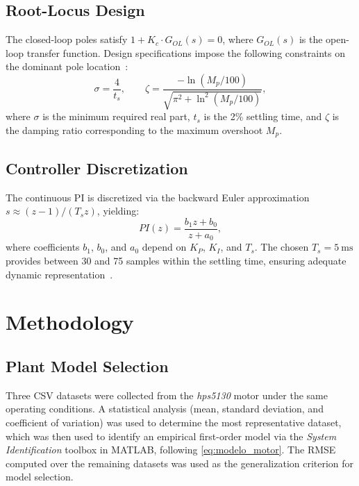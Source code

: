 \documentclass[conference]{IEEEtran}
\begin{document}
\subsection{Root-Locus Design}

The closed-loop poles satisfy $1 + K_c \cdot G_{OL}(s) = 0$, where $G_{OL}(s)$ is
the open-loop transfer function. Design specifications impose the following constraints
on the dominant pole location~\cite{nise}:
\begin{equation}
    \sigma = \frac{4}{t_s}, \qquad
    \zeta = \frac{-\ln(M_p/100)}{\sqrt{\pi^2 + \ln^2(M_p/100)}},
    \label{eq:specs}
\end{equation}
where $\sigma$ is the minimum required real part, $t_s$ is the 2\% settling time,
and $\zeta$ is the damping ratio corresponding to the maximum overshoot $M_p$.


\subsection{Controller Discretization}

The continuous PI is discretized via the backward Euler approximation
$s \approx (z-1)/(T_s z)$, yielding:
\begin{equation}
    PI(z) = \frac{b_1 z + b_0}{z + a_0},
    \label{eq:pi_discreto}
\end{equation}
where coefficients $b_1$, $b_0$, and $a_0$ depend on $K_P$, $K_I$, and $T_s$.
The chosen $T_s = \SI{5}{\milli\second}$ provides between 30 and 75 samples within
the settling time, ensuring adequate dynamic representation~\cite{ogata,nise}.


\section{Methodology}


\subsection{Plant Model Selection}

Three CSV datasets were collected from the \textit{hps5130} motor under the same
operating conditions. A statistical analysis (mean, standard deviation, and
coefficient of variation) was used to determine the most representative dataset, which was
then used to identify an empirical first-order model via the
\textit{System Identification} toolbox in MATLAB, following \eqref{eq:modelo_motor}.
The RMSE computed over the remaining datasets was used as the generalization criterion for model selection.
\end{document}
